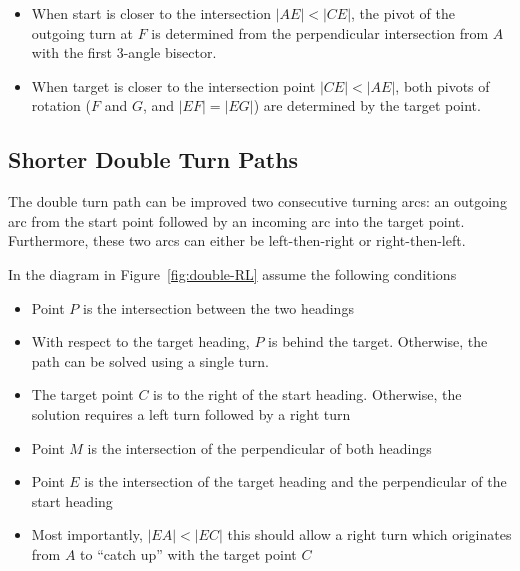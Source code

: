 \documentclass{article}
\begin{document}
\begin{itemize}
  \item When start is closer to the intersection $|AE| < |CE|$, the pivot of the
        outgoing turn at $F$ is determined from the perpendicular intersection from $A$
        with the first 3-angle bisector.
  \item When target is closer to the intersection point $|CE| < |AE|$, both
        pivots of rotation ($F$ and $G$, and $|EF| = |EG|$) are determined by the target point.
\end{itemize}

\subsection*{Shorter Double Turn Paths}
The double turn path can be improved two consecutive turning arcs: an outgoing arc from the start point
followed by an incoming arc into the target point. Furthermore, these two arcs can either be 
left-then-right or right-then-left.

In the diagram in Figure~\ref{fig:double-RL} assume the following conditions
\begin{itemize}
  \item Point $P$ is the intersection between the two headings
  \item With respect to the target heading, $P$ is behind the target. Otherwise, the path
        can be solved using a single turn.
  \item The target point $C$ is to the right of the start heading. Otherwise, the solution requires
        a left turn followed by a right turn
  \item Point $M$ is the intersection of the perpendicular of both headings
  \item Point $E$ is the intersection of the target heading and the perpendicular of the start heading
  \item Most importantly, $|EA| < |EC|$ this should allow a right turn which originates from $A$ to ``catch up''
        with the target point $C$
\end{itemize}
\end{document}

